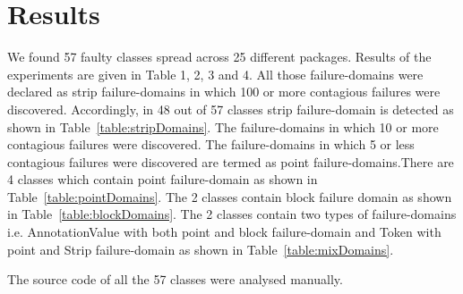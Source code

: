 \documentclass[conference]{IEEEtran}
\begin{document}
\section{Results}
We found 57 faulty classes spread across 25 different packages. Results of the experiments are given in Table 1, 2, 3 and 4. All those failure-domains were declared as strip failure-domains in which 100 or more contagious failures were discovered. Accordingly, in 48 out of 57 classes strip failure-domain is detected as shown in Table~\ref{table:stripDomains}. The failure-domains in which 10 or more contagious failures were discovered. The failure-domains in which 5 or less contagious failures were discovered are termed as point failure-domains.There are 4 classes which contain point failure-domain as shown in Table~\ref{table:pointDomains}. The 2 classes contain block failure domain as shown in Table~\ref{table:blockDomains}. The 2 classes contain two types of failure-domains i.e. AnnotationValue with both point and block failure-domain and Token with point and Strip failure-domain as shown in Table~\ref{table:mixDomains}.

The source code of all the 57 classes were analysed manually.


\end{document}
